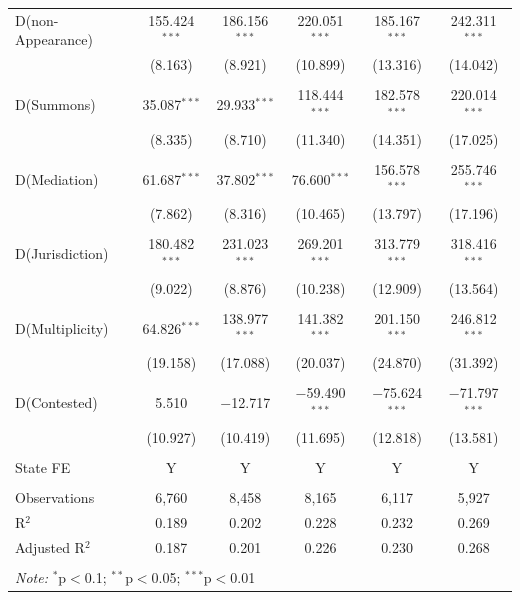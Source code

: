 \documentclass[12pt,a4paper]{article}
\begin{document}
\begin{appendices}
{\begin{longtable}{lcc|ccc}
 D(non-Appearance) & 155.424$^{***}$ & 186.156$^{***}$ & 220.051$^{***}$ & 185.167$^{***}$ & 242.311$^{***}$ \\ 
 & (8.163) & (8.921) & (10.899) & (13.316) & (14.042) \\ 
 & & & & & \\ 
 D(Summons) & 35.087$^{***}$ & 29.933$^{***}$ & 118.444$^{***}$ & 182.578$^{***}$ & 220.014$^{***}$ \\ 
 & (8.335) & (8.710) & (11.340) & (14.351) & (17.025) \\ 
 & & & & & \\ 
 D(Mediation) & 61.687$^{***}$ & 37.802$^{***}$ & 76.600$^{***}$ & 156.578$^{***}$ & 255.746$^{***}$ \\ 
 & (7.862) & (8.316) & (10.465) & (13.797) & (17.196) \\ 
 & & & & & \\ 
 D(Jurisdiction) & 180.482$^{***}$ & 231.023$^{***}$ & 269.201$^{***}$ & 313.779$^{***}$ & 318.416$^{***}$ \\ 
 & (9.022) & (8.876) & (10.238) & (12.909) & (13.564) \\ 
 & & & & & \\ 
 D(Multiplicity) & 64.826$^{***}$ & 138.977$^{***}$ & 141.382$^{***}$ & 201.150$^{***}$ & 246.812$^{***}$ \\ 
 & (19.158) & (17.088) & (20.037) & (24.870) & (31.392) \\ 
 & & & & & \\ 
 D(Contested) & 5.510 & $-$12.717 & $-$59.490$^{***}$ & $-$75.624$^{***}$ & $-$71.797$^{***}$ \\ 
 & (10.927) & (10.419) & (11.695) & (12.818) & (13.581) \\
 
 \hline \\[-1.8ex]
 State FE & Y & Y & Y & Y & Y \\
 \hline \\[-1.8ex] 
 
 Observations & 6,760 & 8,458 & 8,165 & 6,117 & 5,927 \\ 
 R$^{2}$ & 0.189 & 0.202 & 0.228 & 0.232 & 0.269 \\ 
 Adjusted R$^{2}$ & 0.187 & 0.201 & 0.226 & 0.230 & 0.268 \\
 
 \hline \\[-1.8ex] 
 \multicolumn{6}{l}{\textit{Note:} $^{*}$p$<$0.1; $^{**}$p$<$0.05; $^{***}$p$<$0.01} \\
 \end{longtable}
 }
 \pagebreak
 

\end{appendices}
\end{document}

